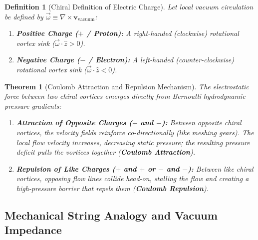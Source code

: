 \documentclass[11pt,a4paper]{article}
\newtheorem{theorem}{Theorem}[section]
\newtheorem{definition}{Definition}[section]
\begin{document}
\begin{definition}[Chiral Definition of Electric Charge]
    \label{def:pozitif_negatif_yuk_kiral_p2}
    Let local vacuum circulation be defined by $\vec{\omega} \equiv \nabla \times \mathbf{v}_{\mathrm{vacuum}}$:
    \begin{enumerate}
        \item \textbf{Positive Charge ($+$ / Proton):} A right-handed (clockwise) rotational vortex sink ($\vec{\omega} \cdot \hat{z} > 0$).
        \item \textbf{Negative Charge ($-$ / Electron):} A left-handed (counter-clockwise) rotational vortex sink ($\vec{\omega} \cdot \hat{z} < 0$).
    \end{enumerate}
\end{definition}

\begin{theorem}[Coulomb Attraction and Repulsion Mechanism]
    \label{thm:coulomb_mekanizma_p2}
    The electrostatic force between two chiral vortices emerges directly from Bernoulli hydrodynamic pressure gradients:
    \begin{enumerate}
        \item \textbf{Attraction of Opposite Charges ($+$ and $-$):} Between opposite chiral vortices, the velocity fields reinforce co-directionally (like meshing gears). The local flow velocity increases, decreasing static pressure; the resulting pressure deficit pulls the vortices together (\textbf{Coulomb Attraction}).
        \item \textbf{Repulsion of Like Charges ($+$ and $+$ or $-$ and $-$):} Between like chiral vortices, opposing flow lines collide head-on, stalling the flow and creating a high-pressure barrier that repels them (\textbf{Coulomb Repulsion}).
    \end{enumerate}
\end{theorem}

\subsection{Mechanical String Analogy and Vacuum Impedance}
\label{sec:tel_ve_dugum_paper2}
\end{document}
